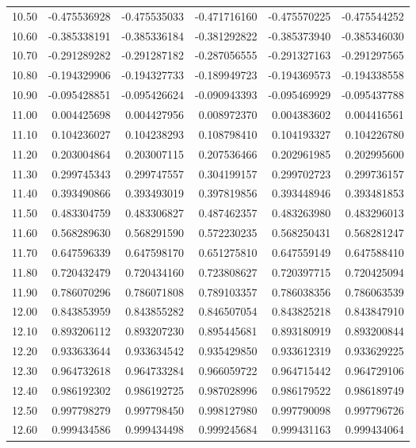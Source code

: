 \documentclass[11pt,a4paper]{article}
\begin{document}
\begin{longtable}{rrrrrr}
10.50 & -0.475536928 & -0.475535033 & -0.471716160 & -0.475570225 & -0.475544252 \\
10.60 & -0.385338191 & -0.385336184 & -0.381292822 & -0.385373940 & -0.385346030 \\
10.70 & -0.291289282 & -0.291287182 & -0.287056555 & -0.291327163 & -0.291297565 \\
10.80 & -0.194329906 & -0.194327733 & -0.189949723 & -0.194369573 & -0.194338558 \\
10.90 & -0.095428851 & -0.095426624 & -0.090943393 & -0.095469929 & -0.095437788 \\
11.00 & 0.004425698 & 0.004427956 & 0.008972370 & 0.004383602 & 0.004416561 \\
11.10 & 0.104236027 & 0.104238293 & 0.108798410 & 0.104193327 & 0.104226780 \\
11.20 & 0.203004864 & 0.203007115 & 0.207536466 & 0.202961985 & 0.202995600 \\
11.30 & 0.299745343 & 0.299747557 & 0.304199157 & 0.299702723 & 0.299736157 \\
11.40 & 0.393490866 & 0.393493019 & 0.397819856 & 0.393448946 & 0.393481853 \\
11.50 & 0.483304759 & 0.483306827 & 0.487462357 & 0.483263980 & 0.483296013 \\
11.60 & 0.568289630 & 0.568291590 & 0.572230235 & 0.568250431 & 0.568281247 \\
11.70 & 0.647596339 & 0.647598170 & 0.651275810 & 0.647559149 & 0.647588410 \\
11.80 & 0.720432479 & 0.720434160 & 0.723808627 & 0.720397715 & 0.720425094 \\
11.90 & 0.786070296 & 0.786071808 & 0.789103357 & 0.786038356 & 0.786063539 \\
12.00 & 0.843853959 & 0.843855282 & 0.846507054 & 0.843825218 & 0.843847910 \\
12.10 & 0.893206112 & 0.893207230 & 0.895445681 & 0.893180919 & 0.893200844 \\
12.20 & 0.933633644 & 0.933634542 & 0.935429850 & 0.933612319 & 0.933629225 \\
12.30 & 0.964732618 & 0.964733284 & 0.966059722 & 0.964715442 & 0.964729106 \\
12.40 & 0.986192302 & 0.986192725 & 0.987028996 & 0.986179522 & 0.986189749 \\
12.50 & 0.997798279 & 0.997798450 & 0.998127980 & 0.997790098 & 0.997796726 \\
12.60 & 0.999434586 & 0.999434498 & 0.999245684 & 0.999431163 & 0.999434064 \\

\end{longtable}
\end{document}
